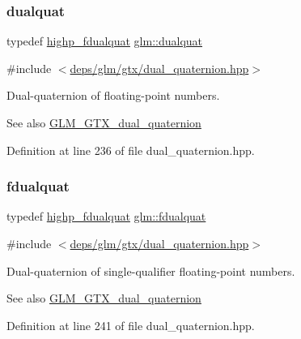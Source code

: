 \subsubsection{\texorpdfstring{dualquat}{dualquat}}
{\footnotesize\ttfamily typedef \hyperlink{group__gtx__dual__quaternion_ga8c46d61c38b2b6d9c5091c667dd20fe8}{highp\+\_\+fdualquat} \hyperlink{group__gtx__dual__quaternion_ga2f6227b5f9dc08a2e7682065a84b3aa9}{glm\+::dualquat}}



{\ttfamily \#include $<$\hyperlink{dual__quaternion_8hpp}{deps/glm/gtx/dual\+\_\+quaternion.\+hpp}$>$}

Dual-\/quaternion of floating-\/point numbers.

\begin{DoxySeeAlso}{See also}
\hyperlink{group__gtx__dual__quaternion}{G\+L\+M\+\_\+\+G\+T\+X\+\_\+dual\+\_\+quaternion} 
\end{DoxySeeAlso}


Definition at line 236 of file dual\+\_\+quaternion.\+hpp.

\mbox{\label{group__gtx__dual__quaternion_ga436906129bc69ca5059555cafcbac9fd}} 
\subsubsection{\texorpdfstring{fdualquat}{fdualquat}}
{\footnotesize\ttfamily typedef \hyperlink{group__gtx__dual__quaternion_ga8c46d61c38b2b6d9c5091c667dd20fe8}{highp\+\_\+fdualquat} \hyperlink{group__gtx__dual__quaternion_ga436906129bc69ca5059555cafcbac9fd}{glm\+::fdualquat}}



{\ttfamily \#include $<$\hyperlink{dual__quaternion_8hpp}{deps/glm/gtx/dual\+\_\+quaternion.\+hpp}$>$}

Dual-\/quaternion of single-\/qualifier floating-\/point numbers.

\begin{DoxySeeAlso}{See also}
\hyperlink{group__gtx__dual__quaternion}{G\+L\+M\+\_\+\+G\+T\+X\+\_\+dual\+\_\+quaternion} 
\end{DoxySeeAlso}


Definition at line 241 of file dual\+\_\+quaternion.\+hpp.

